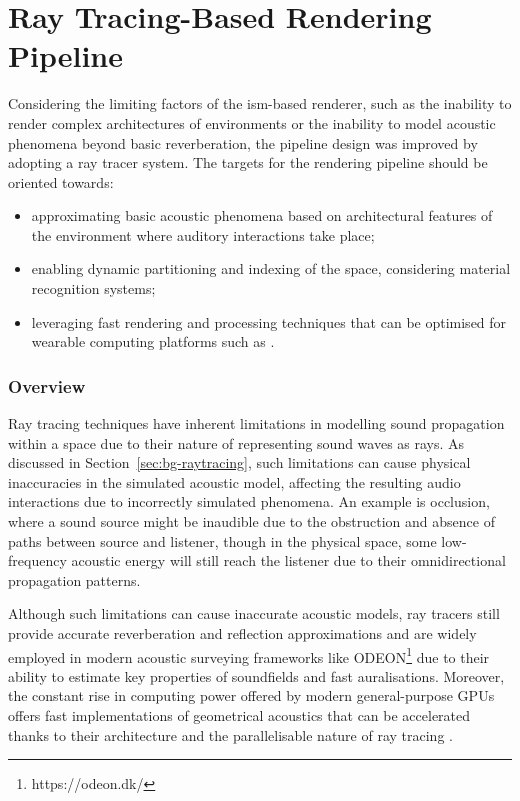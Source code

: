 \section{Ray Tracing-Based Rendering Pipeline}\label{sec:ga-based-pipeline}
Considering the limiting factors of the \acrshort{ism}-based renderer, such as the inability to render complex architectures of environments or the inability to model acoustic phenomena beyond basic reverberation, the pipeline design was improved by adopting a ray tracer system. The targets for the rendering pipeline should be oriented towards: 
\begin{itemize}
    \item approximating basic acoustic phenomena based on architectural features of the environment where auditory interactions take place;
    \item enabling dynamic partitioning and indexing of the space, considering material recognition systems; 
    \item leveraging fast rendering and processing techniques that can be optimised for wearable computing platforms such as .
\end{itemize}

\subsubsection{Overview}
Ray tracing techniques have inherent limitations in modelling sound propagation within a space due to their nature of representing sound waves as rays. As discussed in Section~\ref{sec:bg-raytracing}, such limitations can cause physical inaccuracies in the simulated acoustic model, affecting the resulting audio interactions due to incorrectly simulated phenomena. An example is occlusion, where a sound source might be inaudible due to the obstruction and absence of paths between source and listener, though in the physical space, some low-frequency acoustic energy will still reach the listener due to their omnidirectional propagation patterns. \par
Although such limitations can cause inaccurate acoustic models, ray tracers still provide accurate reverberation and reflection approximations and are widely employed in modern acoustic surveying frameworks like ODEON\footnote{https://odeon.dk/} due to their ability to estimate key properties of soundfields and fast auralisations. Moreover, the constant rise in computing power offered by modern general-purpose GPUs offers fast implementations of geometrical acoustics that can be accelerated thanks to their architecture and the parallelisable nature of ray tracing \citep{savioja2010use}.\par


